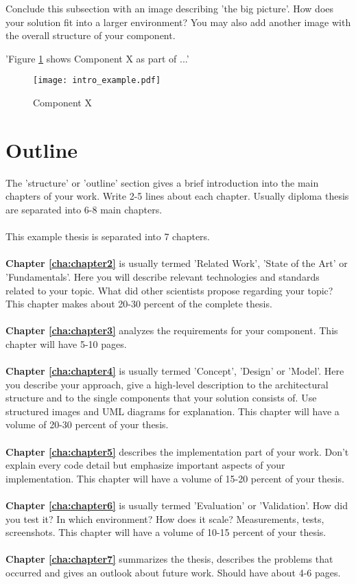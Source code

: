 Conclude this subsection with an image describing 'the big picture'. How does your solution fit into a larger environment? You may also add another image with the overall structure of your component.

'Figure \ref{fig:intro} shows Component X as part of ...' 
\\
\begin{figure}[htb]
  \centering
  \texttt{[image: intro\_example.pdf]}\\
  \caption{Component X}\label{fig:intro}
\end{figure}

\section{Outline\label{sec:outline}}

The 'structure' or 'outline' section gives a brief introduction into the main chapters of your work. Write 2-5 lines about each chapter. Usually diploma thesis are separated into 6-8 main chapters. 
\\
\\
\noindent This example thesis is separated into 7 chapters.
\\
\\
\textbf{Chapter \ref{cha:chapter2}} is usually termed 'Related Work', 'State of the Art' or 'Fundamentals'. Here you will describe relevant technologies and standards related to your topic. What did other scientists propose regarding your topic? This chapter makes about 20-30 percent of the complete thesis.
\\
\\
\textbf{Chapter \ref{cha:chapter3}} analyzes the requirements for your component. This chapter will have 5-10 pages.
\\
\\
\textbf{Chapter \ref{cha:chapter4}} is usually termed 'Concept', 'Design' or 'Model'. Here you describe your approach, give a high-level description to the architectural structure and to the single components that your solution consists of. Use structured images and UML diagrams for explanation. This chapter will have a volume of 20-30 percent of your thesis.
\\
\\
\textbf{Chapter \ref{cha:chapter5}} describes the implementation part of your work. Don't explain every code detail but emphasize important aspects of your implementation. This chapter will have a volume of 15-20 percent of your thesis.
\\
\\
\textbf{Chapter \ref{cha:chapter6}} is usually termed 'Evaluation' or 'Validation'. How did you test it? In which environment? How does it scale? Measurements, tests, screenshots. This chapter will have a volume of 10-15 percent of your thesis.
\\
\\
\textbf{Chapter \ref{cha:chapter7}} summarizes the thesis, describes the problems that occurred and gives an outlook about future work. Should have about 4-6 pages.